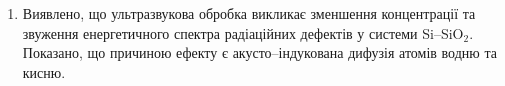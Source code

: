 \begin{enumerate}[leftmargin=0cm,itemindent=3em]
\item Виявлено, що  ультразвукова обробка викликає зменшення концентрації та звуження енергетичного спектра радіаційних дефектів у системи   Si--SiO$_2$.
    Показано, що причиною ефекту є акусто--індукована дифузія атомів водню та кисню.

\end{enumerate}

